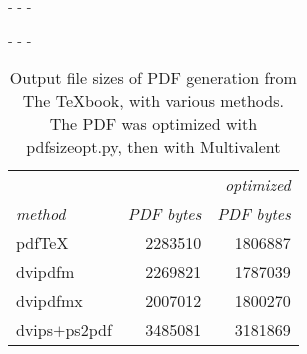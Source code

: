 \documentclass{ltugproc}
\def\cmd{\textsf}
\def\captiontop#1{%
  \advance\abovecaptionskip-\belowcaptionskip
  \advance\belowcaptionskip\abovecaptionskip
  \advance\abovecaptionskip-\belowcaptionskip
  \abovecaptionskip-\abovecaptionskip
  \caption{#1}%
  \advance\abovecaptionskip-\belowcaptionskip
  \advance\belowcaptionskip\abovecaptionskip
  \advance\abovecaptionskip-\belowcaptionskip
  \abovecaptionskip-\abovecaptionskip
}
\begin{document}
\begin{table}
\captiontop{Output file sizes of PDF generation from The \TeX{}book, with
various methods. The PDF was optimized with \cmd{pdfsizeopt.py}, then with
Multivalent}\label{tab:texbook-to-pdf}
\par\small\noindent\hfil
\begin{tabular}{@{}lrr@{}}
\toprule
                  &&\emph{optimized}\\
\emph{method}     &\emph{PDF bytes}&\emph{PDF bytes}\\\midrule
pdf\TeX           &2283510 &1806887\\
\cmd{dvipdfm}     &2269821 &1787039\\
\cmd{dvipdfmx}    &2007012 &1800270\\
\cmd{dvips}$+$\cmd{ps2pdf}      &3485081 &3181869\\
\bottomrule
\end{tabular}
\end{table}
\end{document}

